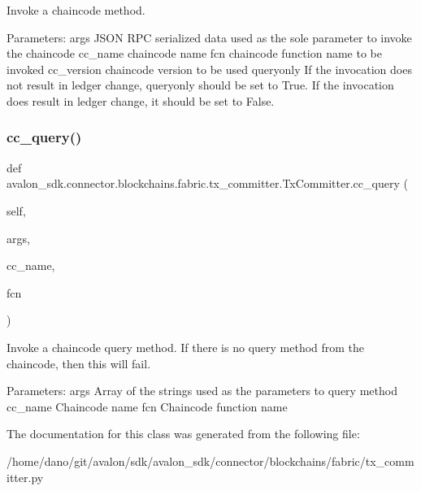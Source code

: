 \begin{DoxyVerb}Invoke a chaincode method.

Parameters:
args       JSON RPC serialized data used as the
   sole parameter to invoke the chaincode
cc_name    chaincode name
fcn        chaincode function name to be invoked
cc_version chaincode version to be used
queryonly  If the invocation does not result in ledger change,
   queryonly should be set to True.
   If the invocation does result in ledger change, it should
   be set to False.
\end{DoxyVerb}
 \mbox{\label{classavalon__sdk_1_1connector_1_1blockchains_1_1fabric_1_1tx__committer_1_1TxCommitter_a1e25ebd71d18d1b604d56cff3ac11c0b}} 
\subsubsection{\texorpdfstring{cc\+\_\+query()}{cc\_query()}}
{\footnotesize\ttfamily def avalon\+\_\+sdk.\+connector.\+blockchains.\+fabric.\+tx\+\_\+committer.\+Tx\+Committer.\+cc\+\_\+query (\begin{DoxyParamCaption}\item[{}]{self,  }\item[{}]{args,  }\item[{}]{cc\+\_\+name,  }\item[{}]{fcn }\end{DoxyParamCaption})}

\begin{DoxyVerb}Invoke a chaincode query method. If there is no query method from the
chaincode, then this will fail.

Parameters:
args     Array of the strings used as the parameters to query method
cc_name  Chaincode name
fcn      Chaincode function name
\end{DoxyVerb}
 

The documentation for this class was generated from the following file\+:\begin{DoxyCompactItemize}
\item 
/home/dano/git/avalon/sdk/avalon\+\_\+sdk/connector/blockchains/fabric/tx\+\_\+committer.\+py\end{DoxyCompactItemize}
